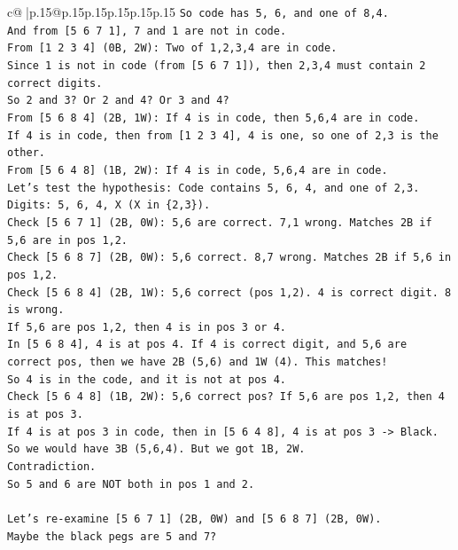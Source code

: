 \documentclass{article}
\begin{document}
{\begin{supertabular}{c@{$\;$}|p{.15\linewidth}@{}p{.15\linewidth}p{.15\linewidth}p{.15\linewidth}p{.15\linewidth}p{.15\linewidth}}
{{{\texttt{So code has 5, 6, and one of 8,4.} \\
\texttt{And from {[}5 6 7 1{]}, 7 and 1 are not in code.} \\
\texttt{From {[}1 2 3 4{]} (0B, 2W): Two of 1,2,3,4 are in code.} \\
\texttt{Since 1 is not in code (from {[}5 6 7 1{]}), then 2,3,4 must contain 2 correct digits.} \\
\texttt{So 2 and 3? Or 2 and 4? Or 3 and 4?} \\
\texttt{From {[}5 6 8 4{]} (2B, 1W): If 4 is in code, then 5,6,4 are in code.} \\
\texttt{If 4 is in code, then from {[}1 2 3 4{]}, 4 is one, so one of 2,3 is the other.} \\
\texttt{From {[}5 6 4 8{]} (1B, 2W): If 4 is in code, 5,6,4 are in code.} \\
\texttt{Let's test the hypothesis: Code contains 5, 6, 4, and one of 2,3.} \\
\texttt{Digits: 5, 6, 4, X (X in \{2,3\}).} \\
\texttt{Check {[}5 6 7 1{]} (2B, 0W): 5,6 are correct. 7,1 wrong. Matches 2B if 5,6 are in pos 1,2.} \\
\texttt{Check {[}5 6 8 7{]} (2B, 0W): 5,6 correct. 8,7 wrong. Matches 2B if 5,6 in pos 1,2.} \\
\texttt{Check {[}5 6 8 4{]} (2B, 1W): 5,6 correct (pos 1,2). 4 is correct digit. 8 is wrong.} \\
\texttt{If 5,6 are pos 1,2, then 4 is in pos 3 or 4.} \\
\texttt{In {[}5 6 8 4{]}, 4 is at pos 4. If 4 is correct digit, and 5,6 are correct pos, then we have 2B (5,6) and 1W (4). This matches!} \\
\texttt{So 4 is in the code, and it is not at pos 4.} \\
\texttt{Check {[}5 6 4 8{]} (1B, 2W): 5,6 correct pos? If 5,6 are pos 1,2, then 4 is at pos 3.} \\
\texttt{If 4 is at pos 3 in code, then in {[}5 6 4 8{]}, 4 is at pos 3 {-}> Black.} \\
\texttt{So we would have 3B (5,6,4). But we got 1B, 2W.} \\
\texttt{Contradiction.} \\
\texttt{So 5 and 6 are NOT both in pos 1 and 2.} \\
\\ 
\texttt{Let's re{-}examine {[}5 6 7 1{]} (2B, 0W) and {[}5 6 8 7{]} (2B, 0W).} \\
\texttt{Maybe the black pegs are 5 and 7?} \\
}}}
\end{supertabular}}
\end{document}
